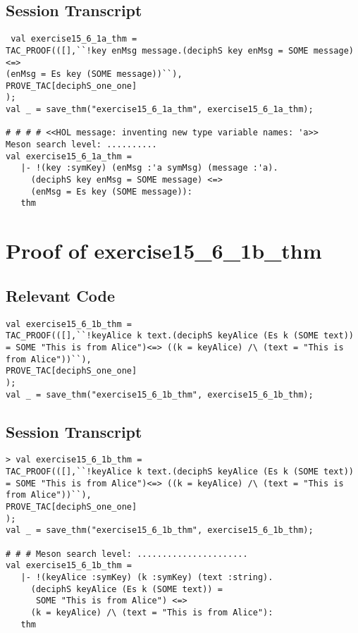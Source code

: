 \documentclass{report}
\begin{document}
\subsection{Session Transcript}
\label{trans1}
\begin{session}
  \begin{scriptsize}
\begin{verbatim}
 val exercise15_6_1a_thm = 
TAC_PROOF(([],``!key enMsg message.(deciphS key enMsg = SOME message) <=>
(enMsg = Es key (SOME message))``),
PROVE_TAC[deciphS_one_one]
);
val _ = save_thm("exercise15_6_1a_thm", exercise15_6_1a_thm);

# # # # <<HOL message: inventing new type variable names: 'a>>
Meson search level: ..........
val exercise15_6_1a_thm =
   |- !(key :symKey) (enMsg :'a symMsg) (message :'a).
     (deciphS key enMsg = SOME message) <=>
     (enMsg = Es key (SOME message)):
   thm
\end{verbatim}
  \end{scriptsize}
\end{session}
\pagebreak

\section{Proof of exercise15_6_1b_thm}
\label{proof-2}

\subsection{Relevant Code}
\label{rel-code-2}
\begin{lstlisting}[frame=TBlr]
val exercise15_6_1b_thm =
TAC_PROOF(([],``!keyAlice k text.(deciphS keyAlice (Es k (SOME text)) = SOME "This is from Alice")<=> ((k = keyAlice) /\ (text = "This is from Alice"))``),
PROVE_TAC[deciphS_one_one]
);
val _ = save_thm("exercise15_6_1b_thm", exercise15_6_1b_thm);

\end{lstlisting}

\subsection{Session Transcript}
\label{trans2}
\begin{session}
  \begin{scriptsize}
\begin{verbatim}
> val exercise15_6_1b_thm =
TAC_PROOF(([],``!keyAlice k text.(deciphS keyAlice (Es k (SOME text)) = SOME "This is from Alice")<=> ((k = keyAlice) /\ (text = "This is from Alice"))``),
PROVE_TAC[deciphS_one_one]
);
val _ = save_thm("exercise15_6_1b_thm", exercise15_6_1b_thm);

# # # Meson search level: ......................
val exercise15_6_1b_thm =
   |- !(keyAlice :symKey) (k :symKey) (text :string).
     (deciphS keyAlice (Es k (SOME text)) =
      SOME "This is from Alice") <=>
     (k = keyAlice) /\ (text = "This is from Alice"):
   thm

\end{verbatim}
  \end{scriptsize}
\end{session}
\end{document}
